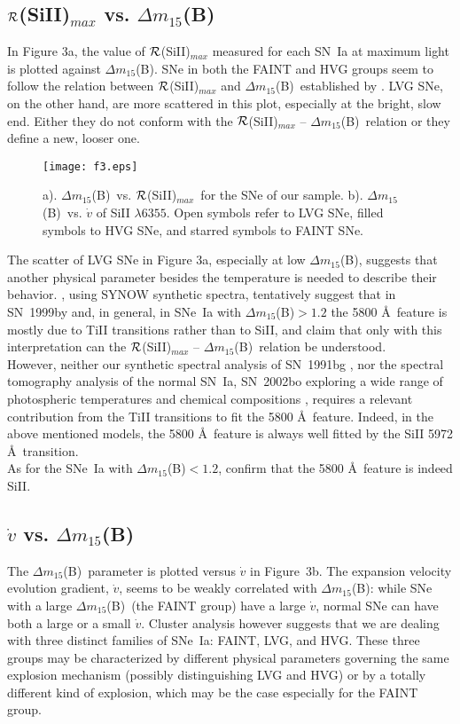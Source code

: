 \documentclass[preprint2]{aastex}
\newcommand{\dm}{$\Delta m_{15}$(B)}
\newcommand{\RSi}{$\cal R$(SiII)}
\begin{document}
\subsection{\RSi$_{max}$ vs. \dm} \label{nug}

In Figure 3a, the value of \RSi$_{max}$ measured for each SN~Ia at maximum
light is plotted against \dm. SNe in both the FAINT and HVG groups seem to
follow the relation between \RSi$_{max}$ and \dm\ established by
\citet{nug95}. LVG SNe, on the other hand, are more scattered in this plot,
especially at the bright, slow end. Either they do not conform with the
\RSi$_{max}$ -- \dm\ relation or they define a new, looser one.

\begin{figure}[t]
\texttt{[image: f3.eps]}
\caption{a). \dm\ vs. \RSi$_{max}$\ for the SNe of our sample.  
b). \dm\ vs. $\dot{v}$ of SiII $\lambda 6355$. 
Open symbols refer to LVG SNe, filled symbols to HVG SNe, and starred symbols 
to FAINT SNe.
}
\end{figure}

The scatter of LVG SNe in Figure 3a, especially at low \dm, suggests
that another physical parameter besides the temperature is needed to
describe their behavior.  \citet{gar04}, using SYNOW synthetic
spectra, tentatively suggest that in SN~1999by and, in general, in
SNe~Ia with \dm$>1.2$ the 5800 \AA\ feature is mostly due to TiII
transitions rather than to SiII, and claim that only with this
interpretation can the \RSi$_{max}$ -- \dm\ relation be understood.\\
However, neither our synthetic spectral analysis of SN~1991bg
\citep{maz97}, nor the spectral tomography analysis of the normal
SN~Ia, SN~2002bo exploring a wide range of photospheric temperatures
and chemical compositions \citep{ste04}, requires a relevant contribution
from the TiII transitions to fit the 5800 \AA\ feature. Indeed, in the
above mentioned models, the 5800 \AA\ feature is always well fitted by
the SiII 5972 \AA\ transition.\\ 
As for the SNe~Ia with \dm$<1.2$, \cite{gar04} confirm that the 5800
\AA\ feature is indeed SiII.


\subsection{$\dot{v}$ vs. \dm}

The \dm\ parameter is plotted versus $\dot{v}$ in Figure~3b. The
expansion velocity evolution gradient, $\dot{v}$, seems to be weakly
correlated with \dm: while SNe with a large \dm\ (the FAINT group)
have a large $\dot{v}$, normal SNe can have both a large or a small
$\dot{v}$. Cluster analysis however suggests that we are dealing with
three distinct families of SNe~Ia: FAINT, LVG, and HVG.  These three
groups may be characterized by different physical parameters governing
the same explosion mechanism (possibly distinguishing LVG and HVG) or
by a totally different kind of explosion, which may be the case
especially for the FAINT group.
\end{document}
